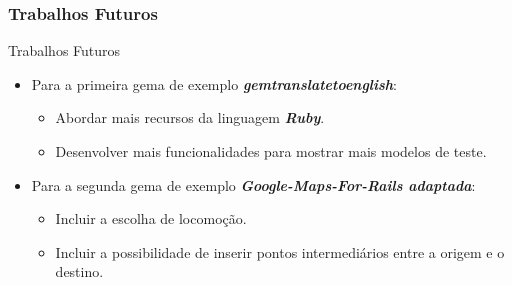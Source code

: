 \begin{frame}
\frametitle{Trabalhos Futuros}
 
  \begin{block}{Trabalhos Futuros}
   
   \begin{itemize}
   
    \item Para a primeira gema de exemplo \emph{\textbf{gemtranslatetoenglish}}:
    
    \begin{itemize}
    
     \item Abordar mais recursos da linguagem \emph{\textbf{Ruby}}.
     
     \item Desenvolver mais funcionalidades para mostrar mais modelos de teste.
     
    \end{itemize}

    \item Para a segunda gema de exemplo \emph{\textbf{Google-Maps-For-Rails adaptada}}:
    
    \begin{itemize}
    
     \item Incluir a escolha de locomoção.
     
     \item Incluir a possibilidade de inserir pontos intermediários entre a origem e o destino.
     
    \end{itemize}

    
   \end{itemize}
   
  \end{block}
 
\end{frame}


